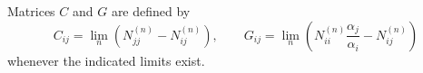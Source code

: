 Matrices $C$ and $G$ are defined by $$C_{ij} = \lim_n (N_{jj}^{(n)} - N_{ij}^{(n)}), \qquad G_{ij} = \lim_n \left(N_{ii}^{(n)} \frac{\alpha_j}{\alpha_i} - N_{ij}^{(n)}\right)$$ whenever the indicated limits exist.